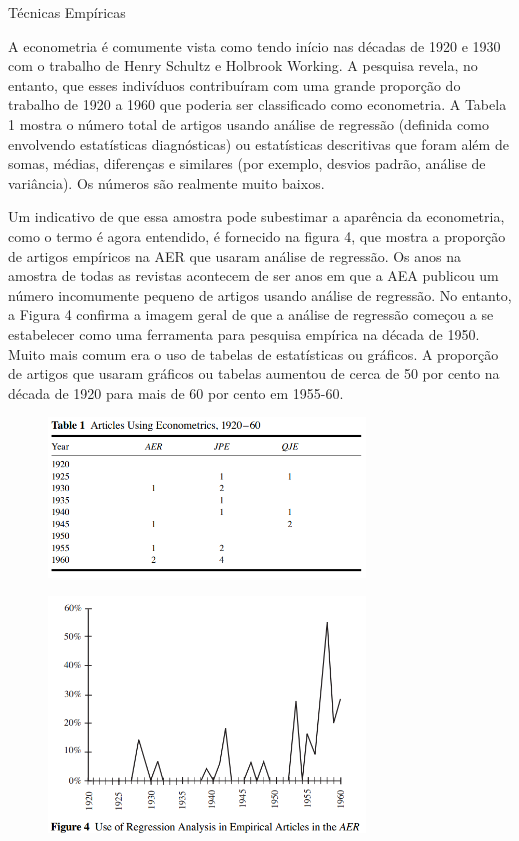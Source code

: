 \documentclass[12pt]{article}
\begin{document}
Técnicas Empíricas

A econometria é comumente vista como tendo início nas décadas de 1920 e 1930 com o trabalho de Henry Schultz e Holbrook Working. A pesquisa revela, no entanto, que esses indivíduos contribuíram com uma grande proporção do trabalho de 1920 a 1960 que poderia ser classificado como econometria. A Tabela 1 mostra o número total de artigos usando análise de regressão (definida como envolvendo estatísticas diagnósticas) ou estatísticas descritivas que foram além de somas, médias, diferenças e similares (por exemplo, desvios padrão, análise de variância). Os números são realmente muito baixos.

Um indicativo de que essa amostra pode subestimar a aparência da econometria, como o termo é agora entendido, é fornecido na figura 4, que mostra a proporção de artigos empíricos na AER que usaram análise de regressão. Os anos na amostra de todas as revistas acontecem de ser anos em que a AEA publicou um número incomumente pequeno de artigos usando análise de regressão. No entanto, a Figura 4 confirma a imagem geral de que a análise de regressão começou a se estabelecer como uma ferramenta para pesquisa empírica na década de 1950. Muito mais comum era o uso de tabelas de estatísticas ou gráficos. A proporção de artigos que usaram gráficos ou tabelas aumentou de cerca de 50 por cento na década de 1920 para mais de 60 por cento em 1955-60.

\begin{figure}[H]
    \centering
    \includegraphics[width=0.75\textwidth]{4º Período/História do Pensamento Econômico/Tradução HPE/Tradução Tópico 7.2/table 1.png}
    \end{figure}

\begin{figure}[H]
    \centering
    \includegraphics[width=0.75\textwidth]{4º Período/História do Pensamento Econômico/Tradução HPE/Tradução Tópico 7.2/figure 4.png}
    \end{figure}
\end{document}
